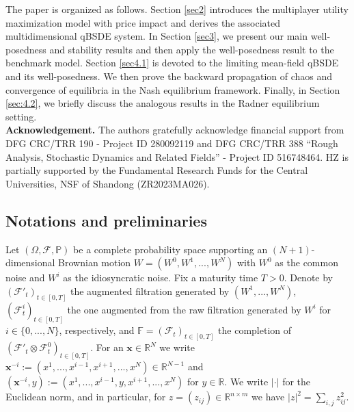 \documentclass[10pt,a4paper]{article}
\newcommand{\MF}{{\mathcal{F}}}
\newcommand{\Bx}{{\mathbf{x}}}
\theoremstyle{plain}
\theoremstyle{definition}
\numberwithin{equation}{section}
\begin{document}
The paper is organized as follows. Section \ref{sec2} introduces the multiplayer utility maximization model with price impact and derives the associated multidimensional qBSDE system. In Section \ref{sec3}, we present our main well-posedness and stability results and then apply the well-posedness result to the benchmark model. Section \ref{sec4.1} is devoted to the limiting mean-field qBSDE and its well-posedness. We then prove the backward propagation of chaos and convergence of equilibria in the Nash equilibrium framework. Finally, in Section \ref{sec:4.2}, we briefly discuss the analogous results in the Radner equilibrium setting.\\

{\bf Acknowledgement.}
The authors gratefully acknowledge financial support from DFG CRC/TRR 190 - Project ID 280092119 and DFG CRC/TRR 388 “Rough Analysis, Stochastic Dynamics and Related Fields” - Project ID 516748464.
HZ is partially supported by the Fundamental Research Funds for the Central Universities, NSF of Shandong (ZR2023MA026).

\subsection{Notations and preliminaries}
\label{sec1.1}

 
Let $(\Omega,\mathcal{F}, \mathbb{P})$ be a complete probability space supporting an $(N+1)$-dimensional Brownian motion
$W = (W^{0},W^{1},...,W^{N})$ with $W^{0}$ as the common noise and $W^{i}$ as the idiosyncratic noise. Fix a maturity time $T>0$. Denote by $(\mathcal{F}'_{t} )_{t \in [0,T]}$ the augmented filtration generated by $(W^{1},...,W^{N})$, $(\mathcal{F}_{t}^{i})_{t \in [0,T]}$ the one augmented from the raw filtration generated by $W^{i}$ for $i \in \{0,...,N\}$, respectively, and $\mathbb{F}=(\MF_t)_{t\in[0,T]}$ the completion of $(\mathcal{F}'_{t}  \otimes \mathcal{F}_{t}^{0})_{t \in [0,T]}$. For an $\Bx \in \mathbb{R}^{N}$ we write $\Bx^{-i} := (x^{1},...,x^{i-1},x^{i+1},...,x^{N}) \in \mathbb{R}^{N-1}$ and $(\Bx^{-i},y) := (x^{1},...,x^{i-1},y,x^{i+1},...,x^{N})$ for $y \in \mathbb{R}$.
We write $|\cdot|$ for the Euclidean norm, and in particular, for $z=(z_{ij}) \in \mathbb{R}^{n \times m}$ we have $|z|^{2} = \sum_{i,j}z_{ij}^{2}$. 
\end{document}
